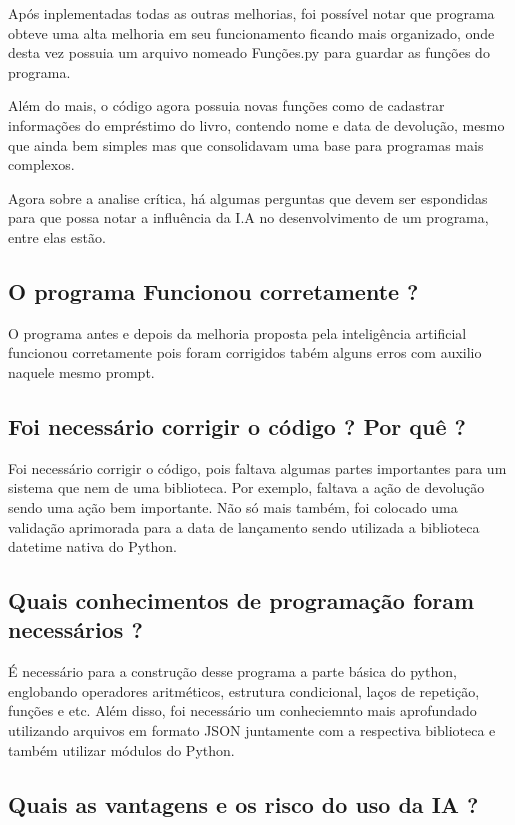 \documentclass[12pt]{article}
\begin{document}
        Após inplementadas todas as outras melhorias, foi possível notar que programa obteve uma alta melhoria em seu funcionamento ficando mais organizado, onde desta vez possuia um arquivo nomeado Funções.py para guardar as funções do programa.

        Além do mais, o código agora possuia novas funções como de cadastrar informações do empréstimo do livro, contendo nome e data de devolução, mesmo que ainda bem simples mas que consolidavam uma base para programas mais complexos.

        Agora sobre a analise crítica, há algumas perguntas que devem ser espondidas para que possa notar a influência da I.A no desenvolvimento de um programa, entre elas estão.

        \subsection{O programa Funcionou corretamente ?}

        O programa antes e depois da melhoria proposta pela inteligência artificial funcionou corretamente pois foram corrigidos tabém alguns erros com auxilio naquele mesmo prompt.

        \subsection{Foi necessário corrigir o código ? Por quê ?}

        Foi necessário corrigir o código, pois faltava algumas partes importantes para um sistema que nem de uma biblioteca. Por exemplo, faltava a ação de devolução sendo uma ação bem importante. Não só mais também, foi colocado uma validação aprimorada para a data de lançamento sendo utilizada a biblioteca datetime nativa do Python.

        \subsection{Quais conhecimentos de programação foram necessários ?}

        É necessário para a construção desse programa a parte básica do python, englobando operadores aritméticos, estrutura condicional, laços de repetição, funções e etc. Além disso, foi necessário um conheciemnto mais aprofundado utilizando arquivos em formato JSON juntamente com a respectiva biblioteca e também utilizar módulos do Python.

        \subsection{Quais as vantagens e os risco do uso da IA ?}
\end{document}
